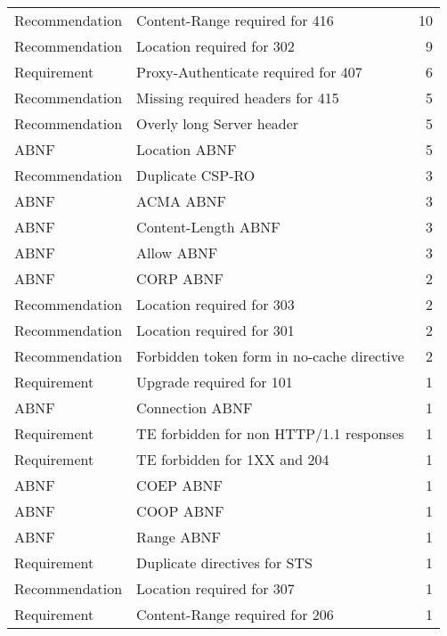 \begin{tabular}{llr}
Recommendation &              Content-Range required for 416 &       10 \\
Recommendation &                   Location required for 302 &        9 \\
   Requirement &         Proxy-Authenticate required for 407 &        6 \\
Recommendation &            Missing required headers for 415 &        5 \\
Recommendation &                   Overly long Server header &        5 \\
          ABNF &                               Location ABNF &        5 \\
Recommendation &                            Duplicate CSP-RO &        3 \\
          ABNF &                                   ACMA ABNF &        3 \\
          ABNF &                         Content-Length ABNF &        3 \\
          ABNF &                                  Allow ABNF &        3 \\
          ABNF &                                   CORP ABNF &        2 \\
Recommendation &                   Location required for 303 &        2 \\
Recommendation &                   Location required for 301 &        2 \\
Recommendation &  Forbidden token form in no-cache directive &        2 \\
   Requirement &                    Upgrade required for 101 &        1 \\
          ABNF &                             Connection ABNF &        1 \\
   Requirement &     TE forbidden for non HTTP/1.1 responses &        1 \\
   Requirement &                TE forbidden for 1XX and 204 &        1 \\
          ABNF &                                   COEP ABNF &        1 \\
          ABNF &                                   COOP ABNF &        1 \\
          ABNF &                                  Range ABNF &        1 \\
   Requirement &                Duplicate directives for STS &        1 \\
Recommendation &                   Location required for 307 &        1 \\
   Requirement &              Content-Range required for 206 &        1 \\
\bottomrule
\end{tabular}

